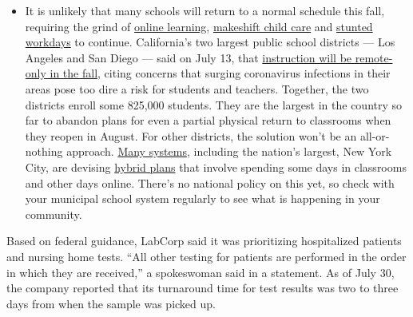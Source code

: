 \begin{itemize}
  \begin{itemize}
  \tightlist
  \item
    It is unlikely that many schools will return to a normal schedule
    this fall, requiring the grind of
    \href{https://www.nytimes3xbfgragh.onion/2020/06/05/us/coronavirus-education-lost-learning.html?action=click\&pgtype=Article\&state=default\&region=MAIN_CONTENT_3\&context=storylines_faq}{online
    learning},
    \href{https://www.nytimes3xbfgragh.onion/2020/05/29/us/coronavirus-child-care-centers.html?action=click\&pgtype=Article\&state=default\&region=MAIN_CONTENT_3\&context=storylines_faq}{makeshift
    child care} and
    \href{https://www.nytimes3xbfgragh.onion/2020/06/03/business/economy/coronavirus-working-women.html?action=click\&pgtype=Article\&state=default\&region=MAIN_CONTENT_3\&context=storylines_faq}{stunted
    workdays} to continue. California's two largest public school
    districts --- Los Angeles and San Diego --- said on July 13, that
    \href{https://www.nytimes3xbfgragh.onion/2020/07/13/us/lausd-san-diego-school-reopening.html?action=click\&pgtype=Article\&state=default\&region=MAIN_CONTENT_3\&context=storylines_faq}{instruction
    will be remote-only in the fall}, citing concerns that surging
    coronavirus infections in their areas pose too dire a risk for
    students and teachers. Together, the two districts enroll some
    825,000 students. They are the largest in the country so far to
    abandon plans for even a partial physical return to classrooms when
    they reopen in August. For other districts, the solution won't be an
    all-or-nothing approach.
    \href{https://bioethics.jhu.edu/research-and-outreach/projects/eschool-initiative/school-policy-tracker/}{Many
    systems}, including the nation's largest, New York City, are
    devising
    \href{https://www.nytimes3xbfgragh.onion/2020/06/26/us/coronavirus-schools-reopen-fall.html?action=click\&pgtype=Article\&state=default\&region=MAIN_CONTENT_3\&context=storylines_faq}{hybrid
    plans} that involve spending some days in classrooms and other days
    online. There's no national policy on this yet, so check with your
    municipal school system regularly to see what is happening in your
    community.
  \end{itemize}
\end{itemize}

Based on federal guidance, LabCorp said it was prioritizing hospitalized
patients and nursing home tests. ``All other testing for patients are
performed in the order in which they are received,'' a spokeswoman said
in a statement. As of July 30, the company reported that its turnaround
time for test results was two to three days from when the sample was
picked up.

